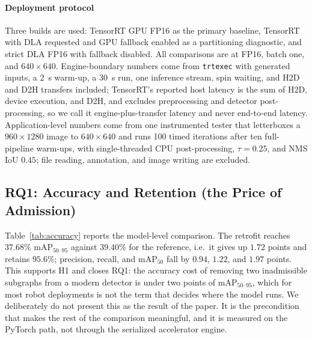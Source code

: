\paragraph*{Deployment protocol}
Three builds are used: TensorRT GPU FP16 as the primary baseline, TensorRT with
DLA requested and GPU fallback enabled as a partitioning diagnostic, and strict
DLA FP16 with fallback disabled. All comparisons are at FP16, batch one, and
$640\times640$. Engine-boundary numbers come from \texttt{trtexec} with
generated inputs, a 2~s warm-up, a 30~s run, one inference stream, spin waiting,
and H2D and D2H transfers included; TensorRT's reported host latency is the sum
of H2D, device execution, and D2H, and excludes preprocessing and detector
post-processing, so we call it engine-plus-transfer latency and never
end-to-end latency. Application-level numbers come from one instrumented tester
that letterboxes a $960\times1280$ image to $640\times640$ and runs 100 timed
iterations after ten full-pipeline warm-ups, with single-threaded CPU
post-processing, $\tau=0.25$, and NMS IoU $0.45$; file reading, annotation, and
image writing are excluded.

\subsection{RQ1: Accuracy and Retention (the Price of Admission)}
\label{sec:rq1}

Table~\ref{tab:accuracy} reports the model-level comparison. The retrofit
reaches $37.68\%$ $\mathrm{mAP}_{50\text{--}95}$ against $39.40\%$ for the
reference, i.e.\ it gives up $1.72$ points and retains $95.6\%$; precision,
recall, and $\mathrm{mAP}_{50}$ fall by $0.94$, $1.22$, and $1.97$ points. This
supports H1 and closes RQ1: the accuracy cost of removing two inadmissible
subgraphs from a modern detector is under two points of
$\mathrm{mAP}_{50\text{--}95}$, which for most robot deployments is not the
term that decides where the model runs. We deliberately do not present this as
the result of the paper. It is the precondition that makes the rest of the
comparison meaningful, and it is measured on the PyTorch path, not through the
serialized accelerator engine.

